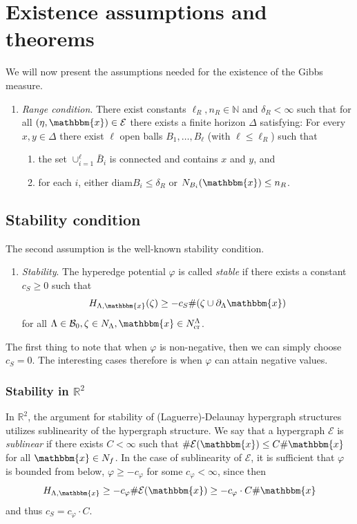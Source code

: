 \documentclass[12pt,a4paper]{article}
\theoremstyle{definition}
\theoremstyle{remark}
\theoremstyle{theorem}
\newcommand{\x}{\mathbbm{x}}
\begin{document}
\section{Existence assumptions and theorems}
We will now present the assumptions needed for the existence of the Gibbs measure.


\begin{enumerate}[\textbf{(R)}]
	\item \textit{Range condition}. There exist constants $\ell_R,n_R \in \mathbb N$ and $\delta_R < \infty$ such that for all $(\eta,\x) \in \mathcal E$ there exists a finite horizon $\Delta$ satisfying: For every $x,y \in \Delta$ there exist $\ell$ open balls $B_1, \dots, B_\ell$ (with $\ell \leq \ell_R$) such that
	\begin{enumerate}[-]
		\item the set $\cup^\ell_{i=1} \bar B_i$ is connected and contains $x$ and $y$, and 
		\item for each $i$, either $\text{diam} B_i \leq \delta_R$ or $N_{B_i}(\x) \leq n_R$.
	\end{enumerate}
\end{enumerate}

\subsection{Stability condition}
The second assumption is the well-known stability condition. 
\begin{enumerate}[\textbf{(S)}] 
	\item \textit{Stability}. The hyperedge potential $\varphi$ is called \textit{stable} if there exists a constant $c_S \geq 0$ such that 
$$H_{\Lambda,\x}(\zeta) \geq -c_S \#(\zeta \cup \partial_\Lambda \x)$$
for all $\Lambda \in \mathcal B_0, \zeta \in N_\Lambda, \x \in N^\Lambda_{\text{cr}}$.
\end{enumerate}

The first thing to note that when $\varphi$ is non-negative, then we can simply choose $c_S = 0$. The interesting cases therefore is when $\varphi$ can attain negative values.\newline

\subsubsection{Stability in $\mathbb R^2$}
In $\mathbb R^2$, the argument for stability of (Laguerre)-Delaunay hypergraph structures utilizes sublinearity of the hypergraph structure. We say that a hypergraph $\mathcal E$ is \textit{sublinear} if there exists $C < \infty$ such that $\# \mathcal E(\x) \leq C \# \x$ for all $\x \in N_f$. In the case of sublinearity of $\mathcal E$, it is sufficient that $\varphi$ is bounded from below, $\varphi \geq - c_\varphi$ for some $c_\varphi < \infty$, since then 
$$H_{\Lambda,\x} \geq -c_\varphi \#\mathcal E(\x) \geq -c_\varphi\cdot C \# \x$$ 
and thus $c_S = c_\varphi \cdot C$.
\end{document}
